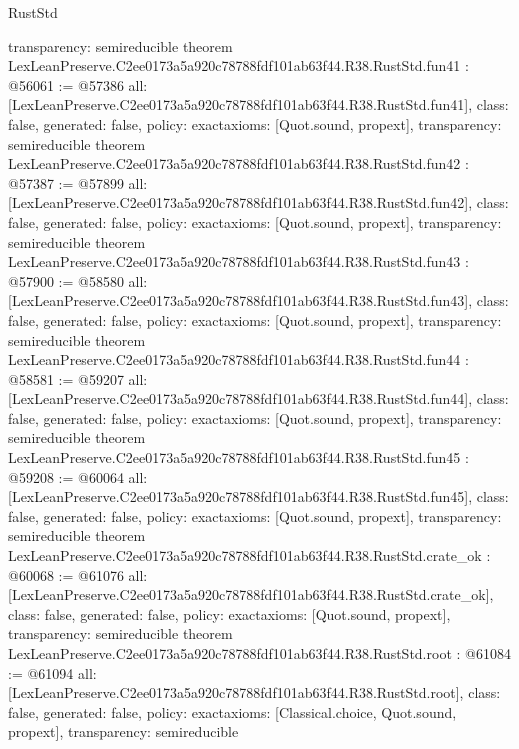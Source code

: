 \begin{lexlean}{RustStd}
\begin{coremodule}
{  transparency: semireducible
}
theorem LexLeanPreserve.C2ee0173a5a920c78788fdf101ab63f44.R38.RustStd.fun41 : @56061 := @57386 {
  all: [LexLeanPreserve.C2ee0173a5a920c78788fdf101ab63f44.R38.RustStd.fun41],
  class: false,
  generated: false,
  policy: exact{axioms: [Quot.sound, propext]},
  transparency: semireducible
}
theorem LexLeanPreserve.C2ee0173a5a920c78788fdf101ab63f44.R38.RustStd.fun42 : @57387 := @57899 {
  all: [LexLeanPreserve.C2ee0173a5a920c78788fdf101ab63f44.R38.RustStd.fun42],
  class: false,
  generated: false,
  policy: exact{axioms: [Quot.sound, propext]},
  transparency: semireducible
}
theorem LexLeanPreserve.C2ee0173a5a920c78788fdf101ab63f44.R38.RustStd.fun43 : @57900 := @58580 {
  all: [LexLeanPreserve.C2ee0173a5a920c78788fdf101ab63f44.R38.RustStd.fun43],
  class: false,
  generated: false,
  policy: exact{axioms: [Quot.sound, propext]},
  transparency: semireducible
}
theorem LexLeanPreserve.C2ee0173a5a920c78788fdf101ab63f44.R38.RustStd.fun44 : @58581 := @59207 {
  all: [LexLeanPreserve.C2ee0173a5a920c78788fdf101ab63f44.R38.RustStd.fun44],
  class: false,
  generated: false,
  policy: exact{axioms: [Quot.sound, propext]},
  transparency: semireducible
}
theorem LexLeanPreserve.C2ee0173a5a920c78788fdf101ab63f44.R38.RustStd.fun45 : @59208 := @60064 {
  all: [LexLeanPreserve.C2ee0173a5a920c78788fdf101ab63f44.R38.RustStd.fun45],
  class: false,
  generated: false,
  policy: exact{axioms: [Quot.sound, propext]},
  transparency: semireducible
}
theorem LexLeanPreserve.C2ee0173a5a920c78788fdf101ab63f44.R38.RustStd.crate_ok : @60068 := @61076 {
  all: [LexLeanPreserve.C2ee0173a5a920c78788fdf101ab63f44.R38.RustStd.crate_ok],
  class: false,
  generated: false,
  policy: exact{axioms: [Quot.sound, propext]},
  transparency: semireducible
}
theorem LexLeanPreserve.C2ee0173a5a920c78788fdf101ab63f44.R38.RustStd.root : @61084 := @61094 {
  all: [LexLeanPreserve.C2ee0173a5a920c78788fdf101ab63f44.R38.RustStd.root],
  class: false,
  generated: false,
  policy: exact{axioms: [Classical.choice, Quot.sound, propext]},
  transparency: semireducible
}


\end{coremodule}
\end{lexlean}
